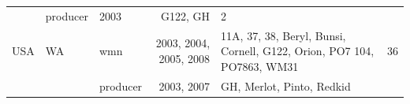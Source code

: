 \documentclass[fleqn,10pt,lineno]{wlpeerj} %
\theoremstyle{definition}
\theoremstyle{definition}
\theoremstyle{definition}
\theoremstyle{remark}
\begin{document}
\begin{longtable}[]{@{}lllrlr@{}}
\begin{minipage}[t]{0.08\columnwidth}
\strut
\end{minipage} & \begin{minipage}[t]{0.12\columnwidth}\raggedright\strut
producer\strut
\end{minipage} & \begin{minipage}[t]{0.19\columnwidth}\raggedleft\strut
2003\strut
\end{minipage} & \begin{minipage}[t]{0.29\columnwidth}\raggedright\strut
G122, GH\strut
\end{minipage} & \begin{minipage}[t]{0.04\columnwidth}\raggedleft\strut
2\strut
\end{minipage}\tabularnewline
\begin{minipage}[t]{0.11\columnwidth}\raggedright\strut
USA\strut
\end{minipage} & \begin{minipage}[t]{0.08\columnwidth}\raggedright\strut
WA\strut
\end{minipage} & \begin{minipage}[t]{0.12\columnwidth}\raggedright\strut
wmn\strut
\end{minipage} & \begin{minipage}[t]{0.19\columnwidth}\raggedleft\strut
2003, 2004, 2005, 2008\strut
\end{minipage} & \begin{minipage}[t]{0.29\columnwidth}\raggedright\strut
11A, 37, 38, Beryl, Bunsi, Cornell, G122, Orion, PO7 104, PO7863,
WM31\strut
\end{minipage} & \begin{minipage}[t]{0.04\columnwidth}\raggedleft\strut
36\strut
\end{minipage}\tabularnewline
\begin{minipage}[t]{0.11\columnwidth}\raggedright\strut
\strut
\end{minipage} & \begin{minipage}[t]{0.08\columnwidth}\raggedright\strut
\strut
\end{minipage} & \begin{minipage}[t]{0.12\columnwidth}\raggedright\strut
producer\strut
\end{minipage} & \begin{minipage}[t]{0.19\columnwidth}\raggedleft\strut
2003, 2007\strut
\end{minipage} & \begin{minipage}[t]{0.29\columnwidth}\raggedright\strut
GH, Merlot, Pinto, Redkid\strut
\end{minipage} & \begin{minipage}[t]{0.04\columnwidth}\raggedleft\strut

\end{minipage}
\end{longtable}
\end{document}
